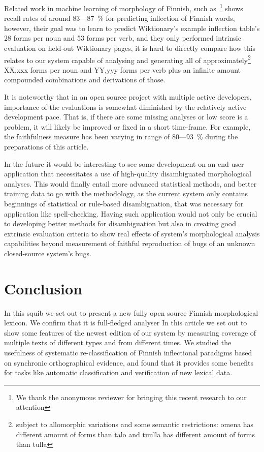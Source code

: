 \documentclass[a4paper,12pt]{article}
\begin{document}
Related work in machine learning of morphology of Finnish, such
as~\cite{durrett2013supervised}\footnote{We thank the anonymous reviewer for
bringing this recent research to our attention} shows recall rates of around
83---87~\% for predicting inflection of Finnish words, however, their goal was
to learn to predict Wiktionary's example inflection table's 28 forms per noun
and 53 forms per verb, and they only performed intrinsic evaluation on held-out
Wiktionary pages, it is hard to directly compare how this relates to our system
capable of analysing and generating all of approximately\footnote{subject to
    allomorphic variations and some semantic restrictions: omena has different
    amount of forms than talo and tuulla has different amount of forms than
tulla} XX,xxx forms per noun and YY,yyy forms per verb plus an infinite amount
compounded combinations and derivations of those.

It is noteworthy that in an open source project with multiple active
developers, importance of the evaluations is somewhat diminished by the
relatively active development pace. That is, if there are some missing analyses
or low score is a problem, it will likely be improved or fixed in a short
time-frame. For example, the faithfulness measure has been varying in range of
80---93~\% during the preparations of this article.

In the future it would be interesting to see some development on an end-user
application that necessitates a use of high-quality disambiguated morphological
analyses. This would finally entail more advanced statistical methods, and
better training data to go with the methodology, as the current system only
contains beginnings of statistical or rule-based disambiguation, that was
necessary for application like spell-checking.  Having such application would
not only be crucial to developing better methods for disambiguation but also in
creating good extrinsic evaluation criteria to show real effects of system's
morphological analysis capabilities beyond measurement of faithful reproduction
of bugs of an unknown closed-source system's bugs.

\section{Conclusion}
\label{sec:conclusion}

In this squib we set out to present a new fully open source Finnish
morphological lexicon. We confirm that it is full-fledged analyser In this
article we set out to show some features of the newest edition of our system by
measuring coverage of multiple texts of different types and from different
times.  We studied the usefulness of systematic re-classification of Finnish
inflectional paradigms based on synchronic orthographical evidence, and found
that it provides some benefits for tasks like automatic classification and
verification of new lexical data.
\end{document}
